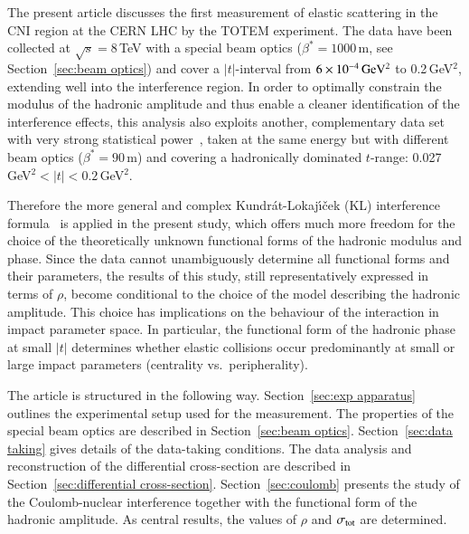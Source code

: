 The present article discusses the first measurement of elastic scattering in the
CNI region at the CERN LHC by the TOTEM experiment. 
The data have been collected at $\sqrt{s} = 8\,$TeV with a special beam optics 
($\beta^{*}=1000\,$m, see Section~\ref{sec:beam optics}) and cover a $|t|$-interval from $6\times10^{-4}\,\rm GeV^{2}$ to 0.2\,GeV$^{2}$, extending well into the interference region. 
In order to optimally constrain the modulus of the hadronic amplitude and thus enable a cleaner identification of the interference effects, 
this analysis also exploits another, complementary data set with very strong statistical power~\cite{8tev-90m}, taken at the same energy but with different beam optics ($\beta^{*}=90\,$m) and covering a hadronically dominated $t$-range: 0.027\,GeV$^{2} < |t| < 0.2\,$GeV$^{2}$. 



%
Therefore the more general and complex Kundr\'{a}t-Lokaj\'{\i}\v{c}ek (KL) interference 
formula~\cite{kl94} is applied in the present study, which offers much more freedom for the
choice of the theoretically unknown functional forms of the hadronic modulus 
and phase. Since the data cannot unambiguously determine all functional forms and their parameters, the results of this study, still representatively 
expressed in terms of $\rho$, become conditional to the choice of the model 
describing the hadronic amplitude. This choice has implications on the behaviour of the interaction in impact parameter space. In particular, the functional 
form of the hadronic phase at small $|t|$ determines whether elastic collisions occur predominantly at small or large impact parameters (centrality vs.~peripherality). 

The article is structured in the following way. Section~\ref{sec:exp apparatus} outlines the experimental setup used for the measurement. The properties of the special beam optics are described in Section~\ref{sec:beam optics}. Section~\ref{sec:data taking} gives details of the data-taking conditions. The data analysis and reconstruction of the differential cross-section are described in Section~\ref{sec:differential cross-section}. Section~\ref{sec:coulomb} presents the study of the Coulomb-nuclear interference together with the functional form of the hadronic amplitude. As central
results, the values of $\rho$ and $\sigma_{\rm tot}$ are determined.

%
